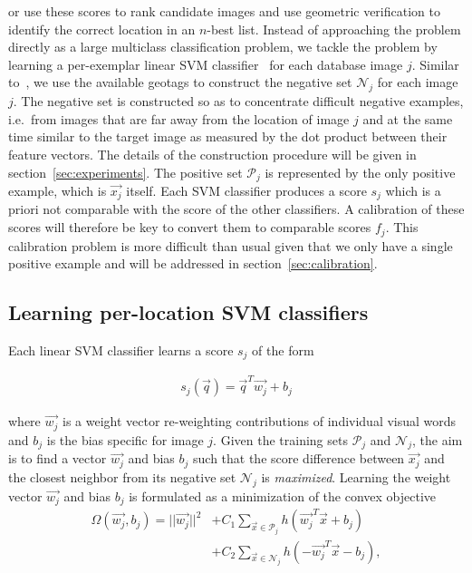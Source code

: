    \noindent
   or use these scores to rank candidate images and use geometric verification to identify the correct location in an $n$-best list.
   Instead of approaching the problem directly as a large multiclass classification problem, we tackle the problem by learning a per-exemplar linear SVM classifier~\cite{Malisiewicz11}  for each database image $j$.
   Similar to~\cite{Knopp2010}, we use the available geotags to construct the negative set $\mathcal N_j$ for each image $j$. The negative set is constructed so as to concentrate difficult negative examples, i.e.\ from images that are far away from the location of image $j$ and at the same time similar to the target image as measured by the dot product between their feature vectors. The details of the construction procedure will be given in section~\ref{sec:experiments}.  The positive set $\mathcal P_j$ is represented by the only positive example, which is $\vec{x_j}$ itself. 
   Each SVM classifier produces a score $s_j$ which is a priori not comparable with the score of the other classifiers. A calibration of these scores will therefore be key to convert them to comparable scores $f_j$. This calibration problem is more difficult than usual given that we only have a single positive example and will be addressed in section~\ref{sec:calibration}.
   
   \subsection{Learning per-location SVM classifiers }
      Each linear SVM classifier learns a score $s_j$ of the form 

      \begin{align}
        s_j(\vec{q})=\vec{q}^T \vec{w_j}+b_j
        \label{eq:linear}
      \end{align}

      \noindent
      where $\vec{w_j}$ is a weight vector re-weighting contributions of individual visual words and $b_j$ is the bias specific for image $j$. Given the training sets $\mathcal P_j$ and $\mathcal N_j$, the aim is to find a vector $\vec{w_j}$ and bias $b_j$ such that the score difference between $\vec{x_j}$ and the closest neighbor from its negative set $\mathcal N_j$ is {\em maximized}. %
      Learning the weight vector $\vec{w_j}$ and bias $b_j$ is formulated as a minimization of the convex objective 
      \begin{align}
        \nonumber
        \Omega(\vec{w_j},b_j)=||\vec{w_j}||^{2}& +C_1\sum_{\vec{x}\in \mathcal P_j}h(\vec{w_j}^T\vec{x}+b_j)   \\
        \label{eq:obj}
                           & +C_2\sum_{\vec{x}\in \mathcal N_j}h(-\vec{w_j}^T\vec{x}-b_j), 
      \end{align}

